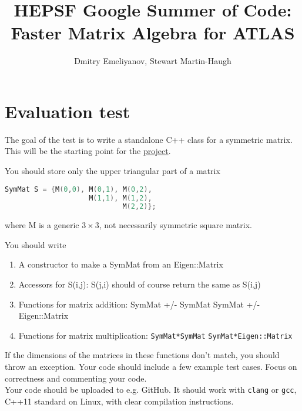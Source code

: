 \documentclass[12pt,a4paper]{article}
\title{HEPSF Google Summer of Code: Faster Matrix Algebra for ATLAS}
\author{Dmitry Emeliyanov, Stewart Martin-Haugh}
\affil{STFC Rutherford Appleton Laboratory}
\begin{document}
\maketitle
\section*{Evaluation test}

The goal of the test is to write a standalone C++ class for a symmetric matrix. This will be the starting point for the \href{http://hepsoftwarefoundation.org/gsoc/2018/proposal\_ATLASEigen.html}{project}.

You should store only the upper triangular part of a matrix

\begin{lstlisting}[language=c++]
SymMat S = {M(0,0), M(0,1), M(0,2),
                    M(1,1), M(1,2),
                            M(2,2)};
\end{lstlisting}

where M is a generic $3\times3$, not necessarily symmetric square matrix.

You should write
\begin{enumerate}
\item A constructor to make a SymMat from an Eigen::Matrix

\item Accessors for S(i,j): S(j,i) should of course return the same as S(i,j)

\item Functions for matrix addition:
\subitem SymMat +/- SymMat
\subitem SymMat +/- Eigen::Matrix

\item Functions for matrix multiplication:
\subitem \lstinline{SymMat*SymMat}
\subitem \lstinline{SymMat*Eigen::Matrix}
\end{enumerate}
If the dimensions of the matrices in these functions don't match, you should throw an exception.
Your code should include a few example test cases. Focus on correctness and commenting your code. \\
 
Your code should be uploaded to e.g. GitHub. It should work with
\lstinline{clang} or \lstinline{gcc}, C++11 standard on Linux, with clear
compilation instructions.
\end{document}
